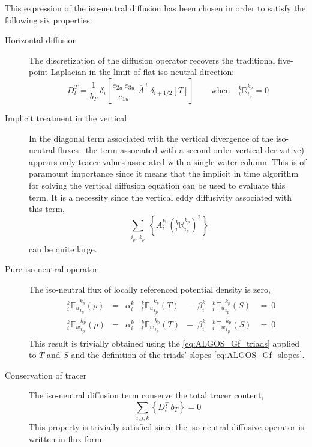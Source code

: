 \documentclass[../main/NEMO_manual]{subfiles}
\begin{document}
This expression of the iso-neutral diffusion has been chosen in order to satisfy the following six properties:
\begin{description}
\item [Horizontal diffusion] The discretization of the diffusion operator recovers the traditional five-point Laplacian in the limit of flat iso-neutral direction:
  \[
    D_l^T = \frac{1}{b_T}  \ \delta_{i}
    \left[ \frac{e_{2u}\,e_{3u}}{e_{1u}} \; \overline{A}^{\,i} \; \delta_{i+1/2}[T] \right]
    \qquad  \text{when} \quad
    { _i^k \mathbb{R}_{i_p}^{k_p} }=0
  \]
\item [Implicit treatment in the vertical] In the diagonal term associated with the vertical divergence of the iso-neutral fluxes
  \ie\ the term associated with a second order vertical derivative)
  appears only tracer values associated with a single water column.
  This is of paramount importance since it means that
  the implicit in time algorithm for solving the vertical diffusion equation can be used to evaluate this term.
  It is a necessity since the vertical eddy diffusivity associated with this term,
  \[
	 \sum_{\substack{i_p, \,k_p}} \left\{
		A_i^k \; \left(_i^k \mathbb{R}_{i_p}^{k_p}\right)^2
    \right\}
  \]
  can be quite large.
\item [Pure iso-neutral operator] The iso-neutral flux of locally referenced potential density is zero, \ie
  \begin{align*}
    \begin{matrix}
      &{_i^k {\mathbb{F}_u}_{i_p}^{k_p} (\rho)}
      &=    &\alpha_i^k   &{_i^k {\mathbb{F}_u}_{i_p}^{k_p} } (T)
      &- \ \;  \beta _i^k    &{_i^k {\mathbb{F}_u}_{i_p}^{k_p} } (S) & = \ 0   \\
      &{_i^k {\mathbb{F}_w}_{i_p}^{k_p} (\rho)}
      &=    &\alpha_i^k   &{_i^k {\mathbb{F}_w}_{i_p}^{k_p} } (T)
      &- \  \; \beta _i^k    &{_i^k {\mathbb{F}_w}_{i_p}^{k_p} } (S)  &= \ 0
    \end{matrix}
  \end{align*}
  This result is trivially obtained using the \autoref{eq:ALGOS_Gf_triads} applied to $T$ and $S$ and
  the definition of the triads' slopes \autoref{eq:ALGOS_Gf_slopes}.
\item [Conservation of tracer] The iso-neutral diffusion term conserve the total tracer content, \ie
  \[
    \sum_{i,j,k} \left\{ D_l^T \ b_T \right\} = 0
  \]
This property is trivially satisfied since the iso-neutral diffusive operator is written in flux form.

\end{description}
\end{document}
